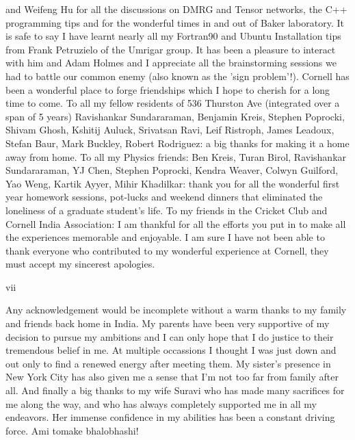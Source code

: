 \documentclass[phd,tocprelim]{cornell}
\begin{document}
\begin{acknowledgements}
and Weifeng Hu for all the discussions on DMRG and Tensor networks, the C++
programming tips and for the wonderful times in and out of Baker laboratory. It
is safe to say I have learnt nearly all my Fortran90 and Ubuntu Installation tips
from Frank Petruzielo of the Umrigar group. It has been a pleasure to interact
with him and Adam Holmes and I appreciate all the brainstorming sessions we
had to battle our common enemy (also known as the ’sign problem’!).
Cornell has been a wonderful place to forge friendships which I hope to
cherish for a long time to come. To all my fellow residents of 536 Thurston Ave
(integrated over a span of 5 years) Ravishankar Sundararaman, Benjamin Kreis,
Stephen Poprocki, Shivam Ghosh, Kshitij Auluck, Srivatsan Ravi, Leif Ristroph,
James Leadoux, Stefan Baur, Mark Buckley, Robert Rodriguez: a big thanks for
making it a home away from home. To all my Physics friends: Ben Kreis, Turan
Birol, Ravishankar Sundararaman, YJ Chen, Stephen Poprocki, Kendra Weaver,
Colwyn Guilford, Yao Weng, Kartik Ayyer, Mihir Khadilkar: thank you for all
the wonderful first year homework sessions, pot-lucks and weekend dinners
that eliminated the loneliness of a graduate student’s life. To my friends in the
Cricket Club and Cornell India Association: I am thankful for all the efforts you
put in to make all the experiences memorable and enjoyable.
I am sure I have not been able to thank everyone who contributed to my
wonderful experience at Cornell, they must accept my sincerest apologies.

vii

Any acknowledgement would be incomplete without a warm thanks to my
family and friends back home in India. My parents have been very supportive
of my decision to pursue my ambitions and I can only hope that I do justice to
their tremendous belief in me. At multiple occassions I thought I was just down
and out only to find a renewed energy after meeting them. My sister’s presence
in New York City has also given me a sense that I’m not too far from family after
all.
And finally a big thanks to my wife Suravi who has made many sacrifices
for me along the way, and who has always completely supported me in all my
endeavors. Her immense confidence in my abilities has been a constant driving
force. Ami tomake bhalobhashi!
\end{acknowledgements}

\contentspage
\tablelistpage
\figurelistpage

\normalspacing \setcounter{page}{1} 
\pagestyle{cornell} \addtolength{\parskip}{0.5\baselineskip}
\end{document}
